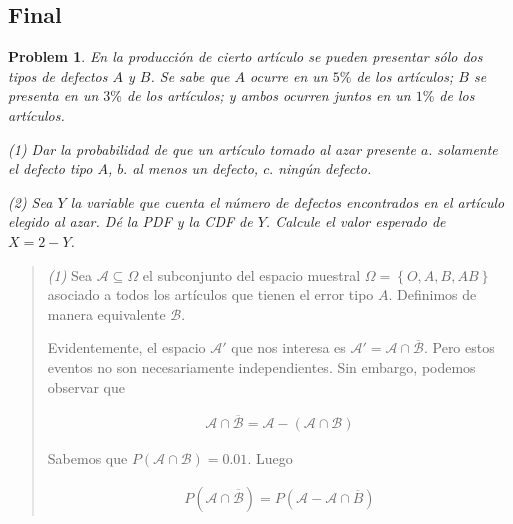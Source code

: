 \documentclass[a4paper, 12pt]{article}
\newtheorem{problem}{Problem}
\newtheorem{problem}{Problem}
\begin{document}
\pagebreak 

\subsection{Final}

\begin{problem}
    En la producción de cierto artículo se pueden presentar sólo dos tipos de
    defectos $A$ y $B$. Se sabe que $A$ ocurre en un $5\%$ de los artículos; $B$
    se presenta en un $3\%$ de los artículos; y ambos ocurren juntos en un $1\%$
    de los artículos.

    \textit{(1)} Dar la probabilidad de que un artículo tomado al azar presente
    $a.$ solamente el defecto tipo $A$, $b.$ al menos un defecto, $c.$ ningún
    defecto. 

    \textit{(2)} Sea $Y$ la variable que cuenta el número de defectos
    encontrados en el artículo elegido al azar. Dé la PDF y la CDF de $Y$.
    Calcule el valor esperado de $X = 2 - Y$.
\end{problem}


\small
\begin{quote}

\textit{(1)} Sea $\mathcal{A} \subseteq \Omega$ el subconjunto del espacio
muestral $\Omega = \left\{ O, A, B, AB \right\} $ asociado a todos los artículos
que tienen el error tipo $A$. Definimos de manera equivalente $\mathcal{B}$.

Evidentemente, el espacio $\mathcal{A}'$ que nos interesa  es $\mathcal{A'} =
\mathcal{A} \cap
\overline{\mathcal{B}}$. Pero estos eventos no son necesariamente
independientes. Sin embargo, podemos observar que 

\begin{align*}
    \mathcal{A} \cap \overline{\mathcal{B}} = \mathcal{A} - (\mathcal{A} \cap
    \mathcal{B})
\end{align*}

Sabemos que $P(\mathcal{A} \cap \mathcal{B}) = 0.01$. Luego 

\begin{align*}
    P(\mathcal{A} \cap \overline{\mathcal{B}}) = P(\mathcal{A} - \mathcal{A}
    \cap \overline{B})
\end{align*}


\end{quote}
\normalsize
\end{document}
